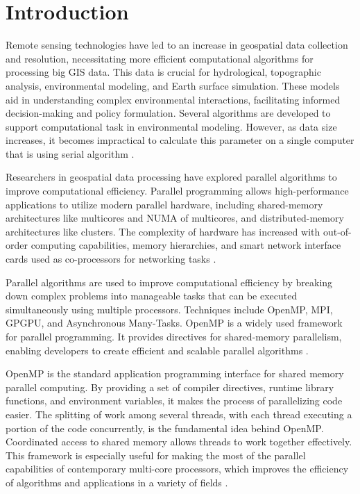 \documentclass[journal, a4paper]{IEEEtran}
\begin{document}
	
	
	
	\maketitle
	
	\thispagestyle{empty}
	\section{Introduction}

	Remote sensing technologies have led to an increase in geospatial data collection and resolution, necessitating more efficient computational algorithms for processing big GIS data. This data is crucial for hydrological, topographic analysis, environmental modeling, and Earth surface simulation. These models aid in understanding complex environmental interactions, facilitating informed decision-making and policy formulation. Several algorithms are developed to support computational task in environmental modeling. However, as data size increases, it becomes impractical to calculate this parameter on a single computer that is using serial algorithm \cite{CHO2023105771,KOTYRA2023105728}.
	
	Researchers in geospatial data processing have explored parallel algorithms to improve computational efficiency. Parallel programming allows high-performance applications to utilize modern parallel hardware, including shared-memory architectures like multicores and NUMA of multicores, and distributed-memory architectures like clusters. The complexity of hardware has increased with out-of-order computing capabilities, memory hierarchies, and smart network interface cards used as co-processors for networking tasks \cite{LOFF2021743}.
	
	Parallel algorithms are used to improve computational efficiency by breaking down complex problems into manageable tasks that can be executed simultaneously using multiple processors. Techniques include OpenMP, MPI, GPGPU, and Asynchronous Many-Tasks. OpenMP is a widely used framework for parallel programming. It provides directives for shared-memory parallelism, enabling developers to create efficient and scalable parallel algorithms \cite{KOTYRA2023105728}.
	
	OpenMP is the standard application programming interface for
	shared memory parallel computing. By providing a set of compiler directives, runtime library functions, and environment variables, it makes the process of parallelizing code easier. The splitting of work among several threads, with each thread executing a portion of the code concurrently, is the fundamental idea behind OpenMP. Coordinated access to shared memory allows threads to work together effectively. This framework is especially useful for making the most of the parallel capabilities of contemporary multi-core processors, which improves the efficiency of algorithms and applications in a variety of fields \cite{chapman2007using}.
	
\end{document}
